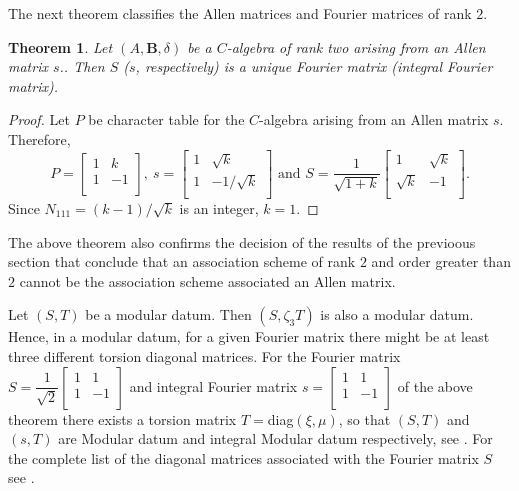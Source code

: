 \documentclass[12pt]{amsart}
\newtheorem{thm}{Theorem}
\begin{document}
The next theorem classifies the Allen matrices and Fourier matrices of rank $2$.

\begin{thm}\label{RankTwoThm}
Let $(A,{{\mathbf B}}, \delta)$ be a $C$-algebra of rank two arising from an Allen matrix $s$.. Then $S$ ($s$, respectively) is a unique Fourier matrix (integral Fourier matrix).
\end{thm}

\begin{proof}
Let  $P$ be character table for the $C$-algebra arising from an Allen matrix $s$. Therefore,
$$P=\left[
       \begin{array}{cc}
         1 & k \\
         1 & -1 \\
       \end{array}
     \right],~ s = \left[
       \begin{array}{cc}
         1 & \sqrt{k} \\
         1 & -1/\sqrt{k} \\
       \end{array}
     \right] \mbox{ and } S= \dfrac1{\sqrt{1+k}}\left[
       \begin{array}{cc}
         1 &  \sqrt{k}  \\
          \sqrt{k}  & -1 \\
       \end{array}
     \right].$$
Since $N_{111} =({k-1})/{\sqrt{k}}$ is an integer, $k=1$.
\end{proof}

The above theorem also confirms the decision of the results of the previoous section that conclude that an association scheme of rank $2$ and order greater than $2$ cannot be the association scheme associated an Allen matrix.

Let $(S,T)$ be a modular datum. Then $(S,\zeta_3T)$ is also a modular datum. Hence, in a modular datum, for a given Fourier matrix there might be at least three different torsion  diagonal matrices.
For the Fourier matrix $S=\dfrac{1}{\sqrt2}\left[
       \begin{array}{cc}
         1 & 1 \\
         1 & -1 \\
       \end{array}
     \right]$ and integral Fourier matrix $s=\left[
       \begin{array}{cc}
         1 & 1 \\
         1 & -1 \\
       \end{array}
     \right]$ of the above theorem there exists a torsion matrix $T=$diag$ (\xi ,\mu)$, so that $(S,T)$ and $(s,T)$ are Modular datum and integral Modular datum respectively, see \cite[Example 1]{MC1}. For the complete list of the diagonal matrices associated with the Fourier matrix $S$ see \cite[Example 36]{G1}.
\end{document}
